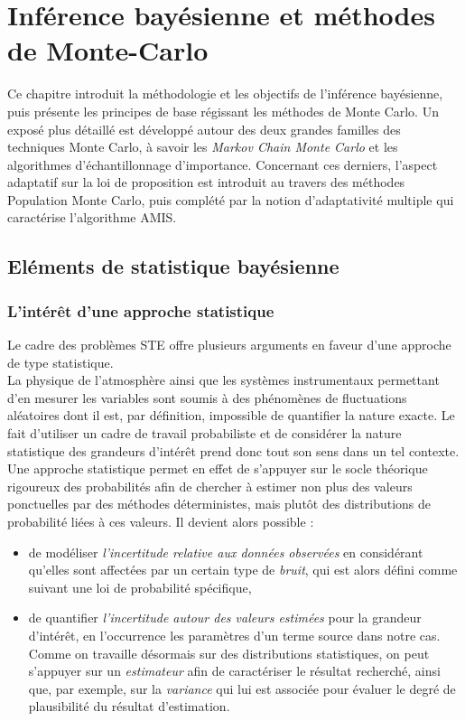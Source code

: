 \chapter{Inférence bayésienne et méthodes de Monte-Carlo}

Ce chapitre introduit {la méthodologie} et les objectifs de l'inférence bayésienne, puis présente les principes de base régissant les méthodes de Monte Carlo. Un exposé plus détaillé est développé autour des deux grandes familles des techniques Monte Carlo, à savoir les \textit{Markov Chain Monte Carlo} et les algorithmes d'échantillonnage d'importance. Concernant ces derniers, l'aspect adaptatif sur la loi de proposition est introduit au travers des méthodes Population Monte Carlo, puis complété par la notion d'adaptativité multiple qui caractérise l'algorithme AMIS. 

	
	\section{Eléments de statistique bayésienne}
	
	\subsection{L'intérêt d'une approche statistique}
	\label{ss_erreurs}
	
	Le cadre des problèmes STE offre plusieurs arguments en faveur d'une approche de type statistique.\\
	
	La physique de l'atmosphère ainsi que les systèmes instrumentaux permettant d'en mesurer les variables sont soumis à des phénomènes de fluctuations aléatoires dont il est, par définition, impossible  de quantifier la nature exacte. Le fait d'utiliser un cadre de travail probabiliste et de considérer la nature statistique des grandeurs d'intérêt prend donc tout son sens dans un tel contexte. Une approche statistique permet en effet de s'appuyer sur le socle théorique rigoureux des probabilités afin de chercher à estimer non plus des valeurs ponctuelles par des méthodes déterministes, mais plutôt des distributions de probabilité liées à ces valeurs. Il devient alors possible : 
	\begin{itemize}
		\item de modéliser \textit{l'incertitude relative aux données observées} en considérant qu'elles sont affectées par un certain type de \textit{bruit}, qui est alors défini comme suivant une loi de probabilité spécifique,
		\item de quantifier \textit{l'incertitude autour des valeurs estimées} pour la grandeur d'intérêt, en l'occurrence les paramètres d'un terme source dans notre cas. Comme on travaille désormais sur des distributions statistiques, on peut s'appuyer sur un \textit{estimateur} afin de caractériser le résultat recherché, ainsi que, {par exemple}, sur la \textit{variance} qui lui est associée pour évaluer le degré de plausibilité du résultat d'estimation.
	\end{itemize}
	


